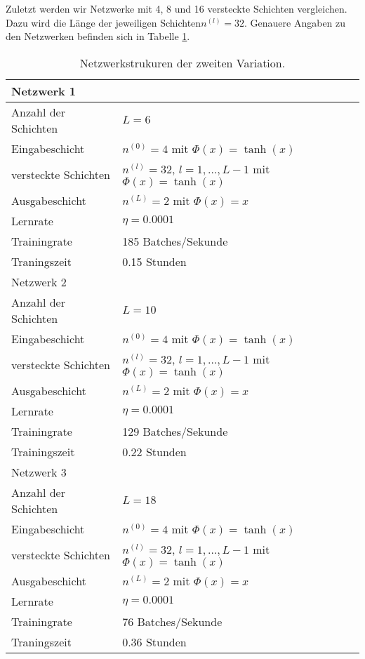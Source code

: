 Zuletzt werden wir Netzwerke mit 4, 8 und 16 versteckte Schichten vergleichen. Dazu wird die Länge der jeweiligen
Schichten$n^{(l)}=32$. Genauere Angaben zu den Netzwerken befinden sich in Tabelle \ref{stiff-table-second}.
\begin{table}
       \renewcommand{\arraystretch}{1.0}
       \centering
       \begin{tabular}{ l | l }
              \hline
              Netzwerk 1 & \\
              \hline
              Anzahl der Schichten & $L=6$ \\
              Eingabeschicht & $n^{(0)}=4$ mit $\Phi(x)=\tanh(x)$ \\
              versteckte Schichten & $n^{(l)}=32$, $l = 1, \dots, L-1$ mit $\Phi(x)=\tanh(x)$ \\
              Ausgabeschicht & $n^{(L)}=2$ mit $\Phi(x)=x$ \\
              Lernrate & $\eta=0.0001$ \\
              Trainingrate & 185 Batches/Sekunde \\
              Traningszeit & 0.15 Stunden \\
              \hline
              Netzwerk 2 & \\
              \hline
              Anzahl der Schichten & $L=10$ \\
              Eingabeschicht & $n^{(0)}=4$ mit $\Phi(x)=\tanh(x)$ \\
              versteckte Schichten & $n^{(l)}=32$, $l = 1, \dots, L-1$ mit $\Phi(x)=\tanh(x)$ \\
              Ausgabeschicht & $n^{(L)}=2$ mit $\Phi(x)=x$ \\
              Lernrate & $\eta=0.0001$ \\
              Trainingrate & 129 Batches/Sekunde \\
              Trainingszeit & 0.22 Stunden \\
              \hline
              Netzwerk 3 & \\
              \hline
              Anzahl der Schichten & $L=18$ \\
              Eingabeschicht & $n^{(0)}=4$ mit $\Phi(x)=\tanh(x)$ \\
              versteckte Schichten & $n^{(l)}=32$, $l = 1, \dots, L-1$ mit $\Phi(x)=\tanh(x)$ \\
              Ausgabeschicht & $n^{(L)}=2$ mit $\Phi(x)=x$ \\
              Lernrate & $\eta=0.0001$ \\
              Trainingrate & 76 Batches/Sekunde \\
              Traningszeit & 0.36 Stunden \\
              \hline
       \end{tabular}
       \caption{Netzwerkstrukuren der zweiten Variation.}
       \label{stiff-table-second}
\end{table}
